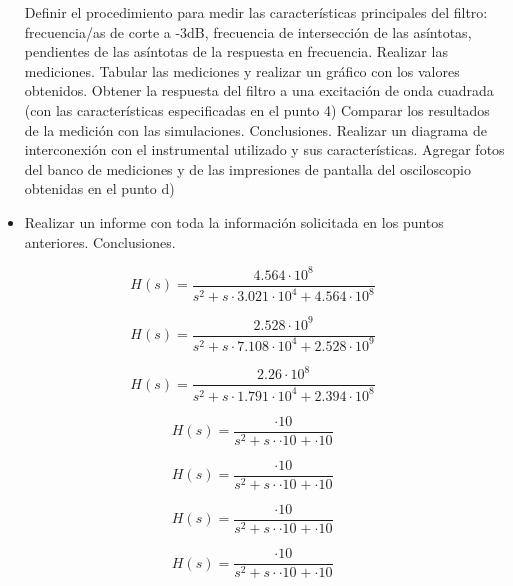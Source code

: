 \begin{itemize}
	\subitem Definir el procedimiento para medir las características principales del filtro: frecuencia/as de corte a -3dB, frecuencia de intersección de las asíntotas, pendientes de las asíntotas de la respuesta en frecuencia. 
	\subitem Realizar las mediciones. Tabular las mediciones y realizar un gráfico con los valores obtenidos.
	\subitem Obtener la respuesta del filtro a una excitación de onda cuadrada (con las características especificadas en el punto 4)
	\subitem Comparar los resultados de la medición con las simulaciones. Conclusiones.
	\subitem Realizar un diagrama de interconexión con el instrumental utilizado y sus características. Agregar fotos del banco de mediciones y de las impresiones de pantalla del osciloscopio obtenidas en el punto d)
\item Realizar un informe con toda la información solicitada en los puntos anteriores. Conclusiones.
\end{itemize}

\begin{equation}
H(s) = \frac{4.564\cdot 10^{8}}{s^2 + s\cdot 3.021 \cdot 10^{4} + 4.564 \cdot 10^{8}}
\end{equation}

\begin{equation}
H(s) = \frac{ 2.528 \cdot 10^{9}}{s^2 + s\cdot 7.108 \cdot 10^{4} + 2.528 \cdot 10^{9}}
\end{equation}

\begin{equation}
H(s) = \frac{ 2.26 \cdot 10^{8}}{s^2 + s \cdot 1.791 \cdot 10^{4} + 2.394 \cdot 10^{8}}
\end{equation}

\begin{equation}
H(s) = \frac{ \cdot 10^{}}{s^2 + s \cdot  \cdot 10^{} +  \cdot 10^{}}
\end{equation}

\begin{equation}
H(s) = \frac{ \cdot 10^{}}{s^2 + s \cdot  \cdot 10^{} +  \cdot 10^{}}
\end{equation}

\begin{equation}
H(s) = \frac{ \cdot 10^{}}{s^2 + s \cdot  \cdot 10^{} +  \cdot 10^{}}
\end{equation}

\begin{equation}
H(s) = \frac{ \cdot 10^{}}{s^2 + s \cdot  \cdot 10^{} +  \cdot 10^{}}
\end{equation}

